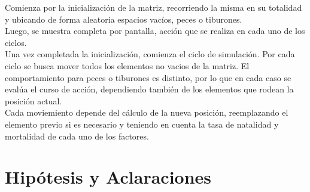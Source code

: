 \documentclass[a4paper,10pt]{article}
\begin{document}
Comienza por la inicializaci\'on de la matriz, recorriendo la misma en su totalidad y ubicando de forma aleatoria espacios vac\'ios, peces o tiburones. \\ 
Luego, se muestra completa por pantalla, acci\'on que se realiza en cada uno de los ciclos.\\

Una vez completada la inicializaci\'on, comienza el ciclo de simulaci\'on. Por cada ciclo se busca mover todos los elementos no vacios de la matriz. El comportamiento para
peces o tiburones es distinto, por lo que en cada caso se eval\'ua el curso de acci\'on, dependiendo tambi\'en de los elementos que rodean la posici\'on actual.\\

Cada moviemiento depende del c\'alculo de la nueva posici\'on, reemplazando el elemento previo si es necesario y teniendo en cuenta la tasa de natalidad y mortalidad de cada uno de los factores.

\section{Hip\'otesis y Aclaraciones}
\end{document}

